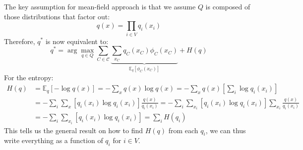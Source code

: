 The key assumption for mean-field approach is that we assume $Q$ is composed of those distributions that factor out:
$$q(x)=\prod_{i \in V} q_i\left(x_i\right)$$
Therefore, $q^*$ is now equivalent to:
$$
q^*=\arg \max _{q \in Q} \sum_{C \in \mathcal{C}} \underbrace{\sum_{x_C} q_C\left(x_C\right) \phi_C\left(x_C\right)}_{\mathbb{E}_q\left[\phi_C\left(x_C\right)\right]}+H(q)
$$
For the entropy:
$$
\begin{aligned}
H(q) & =\mathbb{E}_q[-\log q(x)]=-\sum_x q(x) \log q(x)=-\sum_x q(x)\left[\sum_i \log q_i\left(x_i\right)\right] \\
& =-\sum_i \sum_x\left[q_i\left(x_i\right) \log q_i\left(x_i\right)\right] \frac{q(x)}{q_i\left(x_i\right)}=-\sum_i \sum_{x_i}\left[q_i\left(x_i\right) \log q_i\left(x_i\right)\right] \sum_{x_i} \frac{q(x)}{q_i\left(x_i\right)} \\
& =-\sum_i \sum_{x_i}\left[q_i\left(x_i\right) \log q_i\left(x_i\right)\right]=\sum_i H\left(q_i\right)
\end{aligned}
$$
This tells us the general result on how to find $H(q)$ from each $q_i$, we can thus write everything as a function of $q_i$ for $i \in V$.